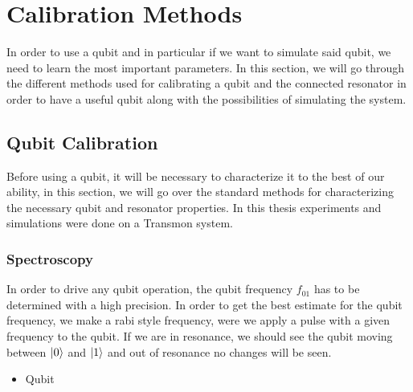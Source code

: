 \chapter{Calibration Methods}
In order to use a qubit and in particular if we want to simulate said qubit, we need to learn the most important parameters. In this section, we will go through the different methods used for calibrating a qubit and the connected resonator in order to have a useful qubit along with the possibilities of simulating the system.


\section{Qubit Calibration}
Before using a qubit, it will be necessary to characterize it to the best of our ability, in this section, we will go over the standard methods for characterizing the necessary qubit and resonator properties. In this thesis experiments and simulations were done on a Transmon system.

\subsection{Spectroscopy}
In order to drive any qubit operation, the qubit frequency $f_{01}$ has to be determined with a high precision. In order to get the best estimate for the qubit frequency, we make a rabi style frequency, were we apply a pulse with a given frequency to the qubit. If we are in resonance, we should see the qubit moving between $\ket{0}$ and $\ket{1}$ and out of resonance no changes will be seen.


\begin{itemize}
    \item Qubit 
\end{itemize}


